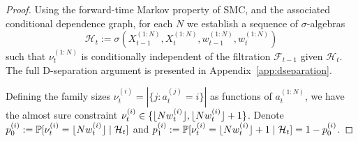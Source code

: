 \begin{proof}
Using the forward-time Markov property of SMC, and the associated conditional dependence graph, for each $N$ we establish a sequence of $\sigma$-algebras
\begin{equation}\label{eq:defn_Ht}
\mathcal{H}_t := \sigma(X_{t-1}^{(1:N)}, X_t^{(1:N)}, w_{t-1}^{(1:N)}, w_t^{(1:N)} )
\end{equation}
such that $\nu_t^{(1:N)}$ is conditionally independent of the filtration $\mathcal{F}_{t-1}$ given $\mathcal{H}_t$. The full D-separation argument is presented in Appendix~\ref{app:dseparation}.

Defining the family sizes $\nu_t^{(i)} = |\{ j : a_t^{(j)} = i \}|$ as functions of $a_t^{(1:N)}$, we have the almost sure constraint $\nu_t^{(i)} \in \{\lfloor N w_t^{(i)} \rfloor, \lfloor N w_t^{(i)} \rfloor +1\}$.  Denote $p_0^{(i)} := \mathbb{P}[ \nu_t^{(i)} = \lfloor N w_t^{(i)} \rfloor \mid \mathcal{H}_t ]$ and $p_1^{(i)} := \mathbb{P}[ \nu_t^{(i)} = \lfloor N w_t^{(i)} \rfloor +1 \mid \mathcal{H}_t ] = 1-p_0^{(i)}$. 


\end{proof}
